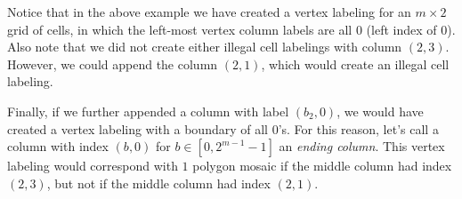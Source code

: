 \documentclass[12pt]{article}
\theoremstyle{plain}
\theoremstyle{definition}
\theoremstyle{remark}
\theoremstyle{definition}
\newcommand{\cell}[4]{ \draw[thick] ( #1 , #2 ) rectangle ( #3 , #4 );}
\newcommand{\lablnode}[3]{\node[shape=circle,draw=none,fill=none, inner sep=0pt,minimum size=0pt] (A) at ( #1 , #2 ) {#3};}
\newcommand{\lablvertex}[3]{\node[shape=circle,draw=none,fill=white, inner sep=2pt,minimum size=5pt] (A) at ( #1 , #2 ) {#3};}
\begin{document}
\begin{center}
\end{center}

Notice that in the above example we have created a vertex labeling for an $m \times 2$ grid of cells, in which the left-most vertex column labels are all $0$ (left index of $0$). Also note that we did not create either illegal cell labelings with column $(2,3)$. However, we could append the column $(2,1)$, which would create an illegal cell labeling. 

Finally, if we further appended a column with label $(b_2,0)$, we would have created a vertex labeling with a boundary of all $0$'s. For this reason, let's call a column with index $(b,0)$ for $b \in [0,2^{m-1}-1]$ an \textit{ending column}. This vertex labeling would correspond with $1$ polygon mosaic if the middle column had index $(2,3)$, but not if the middle column had index $(2,1)$.
\end{document}
